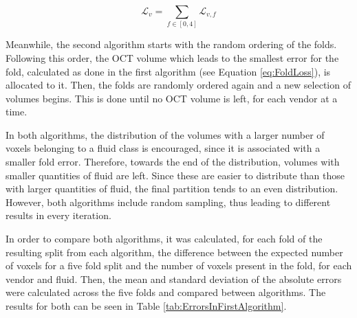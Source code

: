 \begin{equation}
	\mathcal{L}_{v} = \sum_{f \in [0,4]} \mathcal{L}_{v, f} 
	\label{eq:AllFoldsLoss}
\end{equation}

\par
Meanwhile, the second algorithm starts with the random ordering of the folds. Following this order, the OCT volume which leads to the smallest error for the fold, calculated as done in the first algorithm (see Equation \ref{eq:FoldLoss}), is allocated to it. Then, the folds are randomly ordered again and a new selection of volumes begins. This is done until no OCT volume is left, for each vendor at a time.
\par 
In both algorithms, the distribution of the volumes with a larger number of voxels belonging to a fluid class is encouraged, since it is associated with a smaller fold error. Therefore, towards the end of the distribution, volumes with smaller quantities of fluid are left. Since these are easier to distribute than those with larger quantities of fluid, the final partition tends to an even distribution. However, both algorithms include random sampling, thus leading to different results in every iteration.
\par
In order to compare both algorithms, it was calculated, for each fold of the resulting split from each algorithm, the difference between the expected number of voxels for a five fold split and the number of voxels present in the fold, for each vendor and fluid. Then, the mean and standard deviation of the absolute errors were calculated across the five folds and compared between algorithms. The results for both can be seen in Table \ref{tab:ErrorsInFirstAlgorithm}.

